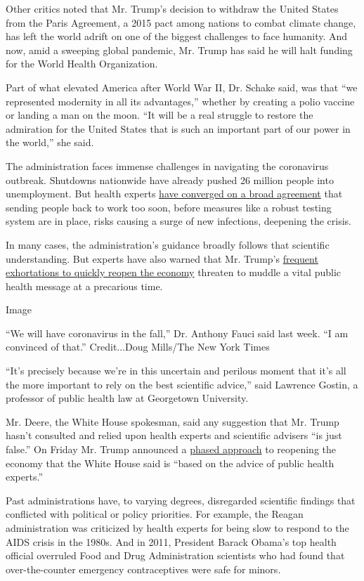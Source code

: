 Other critics noted that Mr. Trump's decision to withdraw the United
States from the Paris Agreement, a 2015 pact among nations to combat
climate change, has left the world adrift on one of the biggest
challenges to face humanity. And now, amid a sweeping global pandemic,
Mr. Trump has said he will halt funding for the World Health
Organization.

Part of what elevated America after World War II, Dr. Schake said, was
that ``we represented modernity in all its advantages,'' whether by
creating a polio vaccine or landing a man on the moon. ``It will be a
real struggle to restore the admiration for the United States that is
such an important part of our power in the world,'' she said.

The administration faces immense challenges in navigating the
coronavirus outbreak. Shutdowns nationwide have already pushed 26
million people into unemployment. But health experts
\href{https://www.nytimes.com/2020/04/06/upshot/coronavirus-four-benchmarks-reopening.html}{have
converged on a broad agreement} that sending people back to work too
soon, before measures like a robust testing system are in place, risks
causing a surge of new infections, deepening the crisis.

In many cases, the administration's guidance broadly follows that
scientific understanding. But experts have also warned that Mr. Trump's
\href{https://www.nytimes.com/2020/04/12/us/when-lockdown-ending-coronavirus.html}{frequent
exhortations to quickly reopen the economy} threaten to muddle a vital
public health message at a precarious time.

Image

``We will have coronavirus in the fall,'' Dr. Anthony Fauci said last
week. ``I am convinced of that.'' Credit...Doug Mills/The New York Times

``It's precisely because we're in this uncertain and perilous moment
that it's all the more important to rely on the best scientific
advice,'' said Lawrence Gostin, a professor of public health law at
Georgetown University.

Mr. Deere, the White House spokesman, said any suggestion that Mr. Trump
hasn't consulted and relied upon health experts and scientific advisers
``is just false.'' On Friday Mr. Trump announced a
\href{https://twitter.com/whitehouse/status/1254904154977337345}{phased
approach} to reopening the economy that the White House said is ``based
on the advice of public health experts.''

Past administrations have, to varying degrees, disregarded scientific
findings that conflicted with political or policy priorities. For
example, the Reagan administration was criticized by health experts for
being slow to respond to the AIDS crisis in the 1980s. And in 2011,
President Barack Obama's top health official overruled Food and Drug
Administration scientists who had found that over-the-counter emergency
contraceptives were safe for minors.

